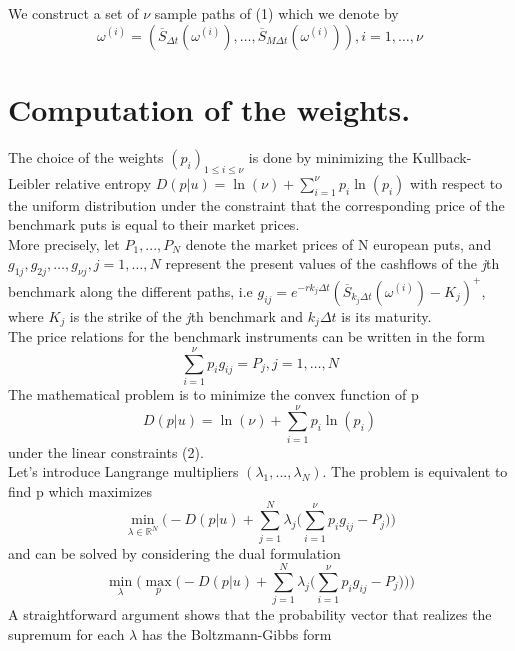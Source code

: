 \documentclass[a4paper,12pt]{article}
\begin{document}
\

\

\begin{flushleft}
We construct a set of $\nu$ sample paths of (1) which we denote
by
$$\omega^{(i)}=(\overline{S}_{\Delta t}(\omega^{(i)}),\hdots,\overline{S}_{M \Delta t}(\omega^{(i)})) , i=1,\hdots,\nu$$
\end{flushleft}
\section*{Computation of the weights.}
The choice of the weights $(p_i)_{1\leq i \leq \nu}$ is done by
minimizing the Kullback-Leibler relative entropy
$D(p\vert{u})=\ln(\nu)+\sum_{i=1}^{\nu}{p_i\ln(p_i)}$ with respect to the
uniform distribution under the constraint that the corresponding price
of the benchmark puts is equal to their market prices.\\
More precisely, let $P_1,...,P_N$ denote the market prices of N
european puts,  and $g_{1j},g_{2j},\hdots,g_{\nu j} ,
j=1,\hdots,N$ represent the present values of the cashflows of the
\emph{j}th benchmark along the different paths, i.e
$g_{ij}=e^{-rk_{j}\Delta t}(\overline{S}_{k_{j}\Delta
  t}(\omega^{(i)})-K_{j})^{+}$, where $K_{j}$ is the strike of the \emph{j}th
benchmark and $k_{j}\Delta t$ is its maturity.
\\
The price relations for the benchmark instruments can be written in the
form
\begin{equation}
\sum_{i=1}^{\nu}{p_i g_{ij}}=P_j, j=1,\hdots,N
\end{equation}
The mathematical problem is to minimize the convex function of p
\begin{equation*}
D(p\vert{u})=\ln(\nu)+\sum_{i=1}^{\nu}{p_i\ln(p_i)}
\end{equation*}
under the linear constraints (2).
\\
Let's introduce Langrange multipliers $(\lambda_1,...,\lambda_N)$. The
problem is equivalent to find p which maximizes $$ \min_{\lambda \in
  \mathbb{R}^N} {\bigg(}-D(p\vert{u})+\sum_{j=1}^{N}{\lambda_j{\bigg(}\sum_{i=1}^{\nu}{p_ig_{ij}}-P_j}{\bigg)\bigg )}$$ and can be solved by considering the dual formulation
\begin{equation*}
\min_{\lambda}\bigg(\max_{p}\bigg(-D(p\vert{u})+\sum_{j=1}^{N}{\lambda_j\bigg(\sum_{i=1}^{\nu}{p_ig_{ij}}-P_j}\bigg)\bigg)\bigg
)
\end{equation*}
A straightforward argument shows that the probability vector that
realizes the supremum for each $\lambda$ has the Boltzmann-Gibbs form
\end{document}

